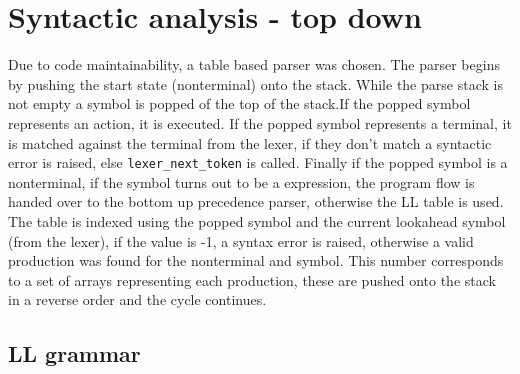 \documentclass[11pt]{article}
\begin{document}
\section{Syntactic analysis - top down}
Due to code maintainability, a table based parser was chosen. The parser begins by pushing the start state (nonterminal) onto the stack. While the parse stack is not empty a symbol is popped of the top of the stack.If the popped symbol represents an action, it is executed. If the popped symbol represents a terminal, it is matched against the terminal from the lexer, if they don't match a syntactic error is raised, else \texttt{lexer\_next\_token} is called. Finally if the popped symbol is a nonterminal, if the symbol turns out to be a expression, the program flow is handed over to the bottom up precedence parser, otherwise the LL table is used. The table is indexed using the popped symbol and the current lookahead symbol (from the lexer), if the value is -1, a syntax error is raised, otherwise a valid production was found for the nonterminal and symbol. This number corresponds to a set of arrays representing each production, these are pushed onto the stack in a reverse order and the cycle continues.\cite[p.~211]{10.5555/77624}
\subsection{LL grammar}
\end{document}
